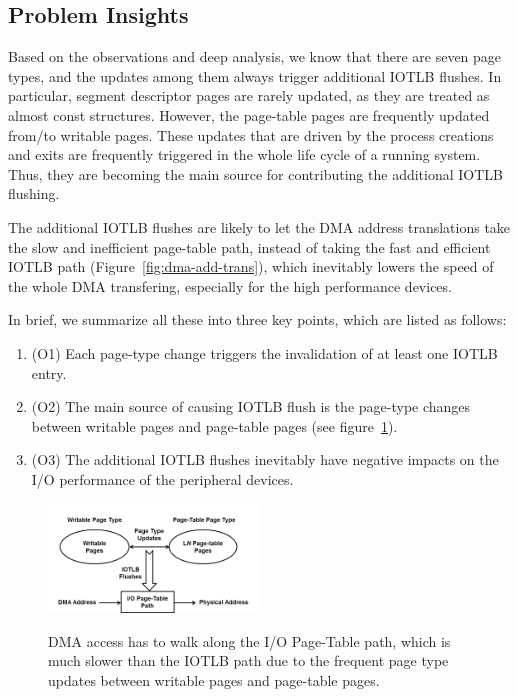\subsection{Problem Insights} \label{sec:insight}
Based on the observations and deep analysis, we know that there are seven page types, and the updates among them always trigger additional IOTLB flushes.
In particular, segment descriptor pages are rarely updated, as they are treated as almost const structures.
However, the page-table pages are frequently updated from/to writable pages.
These updates that are driven by the process creations and exits are frequently triggered in the whole life cycle of a running system.
Thus, they are becoming the main source for contributing the additional IOTLB flushing.

The additional IOTLB flushes are likely to let the DMA address
translations take the slow and inefficient page-table path,
instead of taking the fast and efficient IOTLB path (Figure~\ref{fig:dma-add-trans}), which inevitably lowers the
speed of the whole DMA transfering, especially for the high performance devices.


In brief, we summarize all these into three key points, which are listed as follows:
\begin{enumerate}
\item (O1) Each page-type change triggers the invalidation of at least one IOTLB entry.
\item (O2) The main source of causing IOTLB flush is the page-type changes between writable pages and page-table pages (see figure~\ref{fig:pro-ill}).
\item (O3) The additional IOTLB flushes inevitably have negative impacts on the I/O performance of the peripheral devices.
\end{enumerate}

\begin{figure}[ht]
\centering
\includegraphics[width=0.5\textwidth]{image/background/problem-illustration.png} \\
\caption{DMA access has to walk along the I/O Page-Table path, which is much slower than the IOTLB path due to the frequent page type updates between writable pages and page-table pages.}
\label{fig:pro-ill}
\end{figure}

